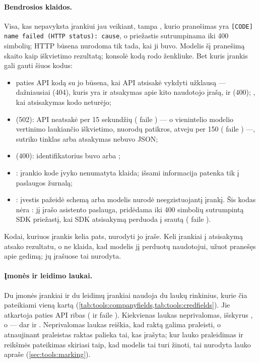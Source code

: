 \paragraph{Bendrosios klaidos.} Visa, kas nepavyksta įrankiui jau veikiant, tampa
, kurio pranešimas yra \texttt{[CODE] name failed (HTTP status): cause}, o
priežastis sutrumpinama iki 400 simbolių; HTTP būsena nurodoma tik tada, kai ji buvo. Modelis šį
pranešimą skaito kaip iškvietimo rezultatą; konsolė kodą rodo ženkliuke. Bet kuris įrankis gali
gauti šiuos kodus:

\begin{itemize}
  \item paties API kodą su jo būsena, kai API atsisakė vykdyti užklausą --- dažniausiai
     (404), kuris yra ir atsakymas apie kito naudotojo įrašą, ir
     (400); , kai atsisakymas kodo neturėjo;
  \item {} (502): API neatsakė per 15 sekundžių (
    faile ) --- o vienintelio modelio vertinimo laukiančio iškvietimo, nuorodų
    patikros, atveju per 150 ( faile ) ---,
    sutriko tinklas arba atsakymas nebuvo JSON;
  \item {} (400): identifikatorius buvo  arba ;
  \item {}: įrankio kode įvyko nenumatyta klaida; išsami informacija patenka tik į paslaugos
    žurnalą;
  \item {}: įvestis pažeidė schemą arba modelis nurodė neegzistuojantį
    įrankį. Šis kodas nėra : jį įrašo asistento paslauga, pridėdama iki 400
    simbolių sutrumpintą SDK priežastį, kai SDK atsisakymą perduoda į srautą
    ( faile ).
\end{itemize}

Kodai, kuriuos įrankis kelia pats, nurodyti jo įraše. Keli įrankiai į atsisakymą atsako
rezultatu, o ne klaida, kad modelis jį perduotų naudotojui, užuot pranešęs apie gedimą; jų
įrašuose tai nurodyta.

\paragraph{Įmonės ir leidimo laukai.} Du įmonės įrankiai ir du leidimų įrankiai naudoja du
laukų rinkinius, kurie čia pateikiami vieną kartą (\cref{tab:tools:companyfields,tab:tools:credfields}).
Jie atkartoja paties API ribas ( ir  faile
). Kiekvienas laukas neprivalomas, išskyrus , o
 --- dar ir . Neprivalomas laukas reiškia, kad raktą galima
praleisti, o atnaujinant praleistas raktas palieka tai, kas įrašyta; kur lauko praleidimas ir
reikšmės pateikimas skiriasi taip, kad modelis tai turi žinoti, tai nurodyta lauko apraše
(\cref{sec:tools:marking}).


